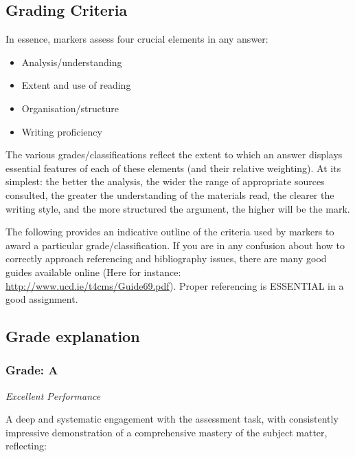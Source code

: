 
\subsection*{Grading Criteria}

In essence, markers assess four crucial elements in any answer:

\begin{itemize}
	\item Analysis/understanding
	\item Extent and use of reading
	\item Organisation/structure
	\item Writing proficiency
\end{itemize}

The various grades/classifications reflect the extent to which an answer displays essential features of each of these elements (and their relative weighting). At its simplest: the better the analysis, the wider the range of appropriate sources consulted, the greater the understanding of the materials read, the clearer the writing style, and the more structured the argument, the higher will be the mark. 

The following provides an indicative outline of the criteria used by markers to award a particular grade/classification. If you are in any confusion about how to correctly approach referencing and bibliography issues, there are many good guides available online (Here for instance: \url{http://www.ucd.ie/t4cms/Guide69.pdf}). Proper referencing is ESSENTIAL in a good assignment.

\subsection*{Grade explanation}

\subsubsection*{Grade: A}

\textit{Excellent Performance}

A deep and systematic engagement with the assessment task, with consistently impressive demonstration of a comprehensive mastery of the subject matter, reflecting:

